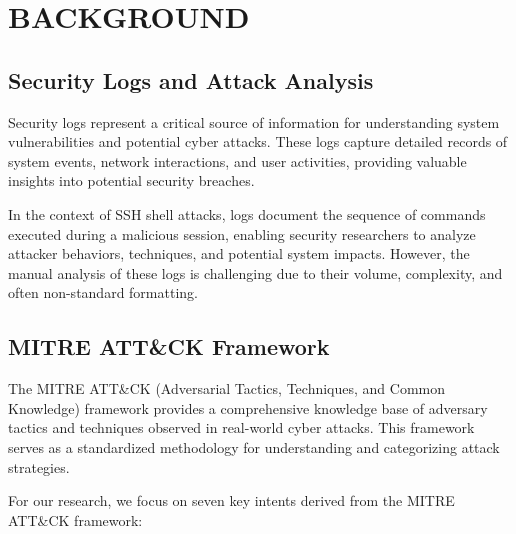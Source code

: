 

\section{BACKGROUND}


    \subsection{Security Logs and Attack Analysis}
    
        Security logs represent a critical source of information for understanding system vulnerabilities and potential cyber attacks. These logs capture detailed records of system events, network interactions, and user activities, providing valuable insights into potential security breaches.

        In the context of SSH shell attacks, logs document the sequence of commands executed during a malicious session, enabling security researchers to analyze attacker behaviors, techniques, and potential system impacts. However, the manual analysis of these logs is challenging due to their volume, complexity, and often non-standard formatting.

    \subsection{MITRE ATT\&CK Framework}
    
        The MITRE ATT\&CK (Adversarial Tactics, Techniques, and Common Knowledge) framework provides a comprehensive knowledge base of adversary tactics and techniques observed in real-world cyber attacks. This framework serves as a standardized methodology for understanding and categorizing attack strategies.

        \noindent For our research, we focus on seven key intents derived from the MITRE ATT\&CK framework:

